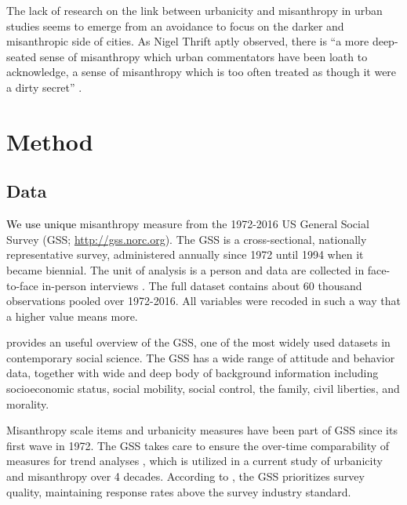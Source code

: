 \documentclass[11pt, letterpaper]{article}
\newcommand{\hilite}[1]{\textcolor{black}{#1}}
\begin{document}
\begin{spacing}{1.4}
The lack of research on the link between urbanicity and misanthropy in urban studies
seems to emerge from an avoidance to focus on the darker and misanthropic side
of cities. As Nigel Thrift aptly observed, there is ``a more deep-seated sense of misanthropy which urban commentators have been loath to acknowledge, a sense of misanthropy which is too often treated as though it were a dirty secret'' \citep[p. 134]{thrift05}. 





\section*{Method} 

\subsection*{Data}

\hilite{We use unique} misanthropy measure from the 1972-2016 US General Social Survey (GSS;
\url{http://gss.norc.org}). The GSS is a cross-sectional, nationally
representative survey, administered annually since 1972 until 1994 when it
became biennial. The unit of analysis is a person and data are collected in face-to-face in-person interviews \citep{davis07}. The full dataset contains about 60 thousand observations pooled over 1972-2016. All variables were recoded in such a way that a higher value means more. 

\citet{marsden20} provides an useful overview  of the GSS, one of the most
widely used datasets in contemporary social science. The GSS has a wide range of
attitude and behavior data, together with  wide and deep body of background
information including socioeconomic status, social mobility,
social control, the family, civil liberties, and morality. %
%

Misanthropy scale items and urbanicity
measures have been part of GSS since its first wave in 1972. 
 The GSS takes care to ensure the over-time comparability of measures for trend
 analyses \citep{marsden20}, which is  utilized in a current study of urbanicity and misanthropy
 over 4 decades. According to \citet{marsden20}, the GSS prioritizes survey quality, maintaining response rates above the survey industry standard.


\end{spacing}
\end{document}

